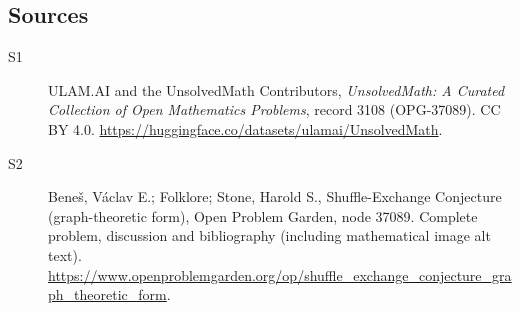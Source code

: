 \documentclass[11pt]{book}
\begin{document}
\subsection{Sources}
\begin{description}
\item[\hypertarget{source:3108:1}{S1}] ULAM.AI and the UnsolvedMath Contributors, \emph{UnsolvedMath: A Curated Collection of Open Mathematics Problems}, record 3108 (OPG-37089). CC BY 4.0. \url{https://huggingface.co/datasets/ulamai/UnsolvedMath}.
\item[\hypertarget{source:3108:2}{S2}] Beneš, Václav E.; Folklore; Stone, Harold S., Shuffle-Exchange Conjecture (graph-theoretic form), Open Problem Garden, node 37089. Complete problem, discussion and bibliography (including mathematical image alt text). \url{https://www.openproblemgarden.org/op/shuffle_exchange_conjecture_graph_theoretic_form}.
\end{description}
\label{end:3108}
\end{document}
